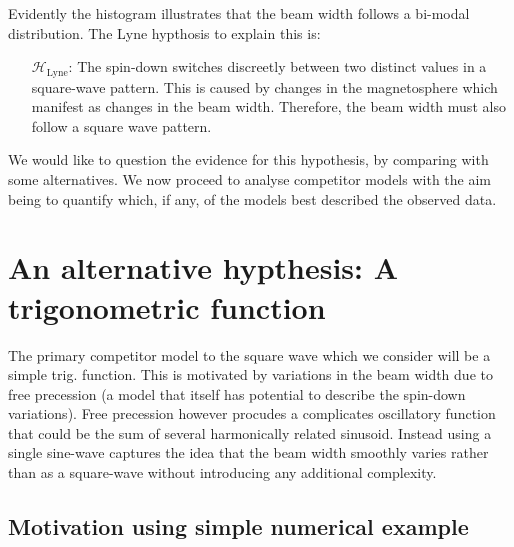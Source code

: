 \documentclass[/home/greg/Thesis/main/main.tex]{subfiles}
\begin{document}
Evidently the histogram illustrates that the beam width follows a bi-modal
distribution. The Lyne hypthosis to explain this is:

\begin{itemize}

    \item[$\mathcal{H}_{\textrm{Lyne}}$:] The spin-down switches discreetly between two
        distinct values in a square-wave pattern. This is caused by changes in
        the magnetosphere which manifest as changes in the beam width.
        Therefore, the beam width must also follow a square wave pattern.

\end{itemize}

We would like to question the evidence for this hypothesis, by comparing with 
some alternatives. We now proceed to analyse competitor models with
the aim being to quantify which, if any, of the models best described the
observed data.

\FloatBarrier
\section{An alternative hypthesis: A trigonometric function}
\graphicspath{{/home/greg/Neutron_star_modelling/AnalysisLyneObservations/img/}}

The primary competitor model to the square wave which we consider will be a
simple trig. function. This is motivated by variations in the beam width due to
free precession (a model that itself has potential to describe the spin-down
variations). Free precession however procudes a complicates oscillatory
function that could be the sum of several harmonically related sinusoid.
Instead using a single sine-wave captures the idea that the beam width smoothly
varies rather than as a square-wave without introducing any additional
complexity. 

\subsection{Motivation using simple numerical example}
\end{document}
